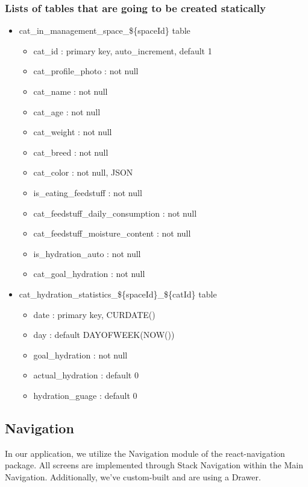 \documentclass[conference]{IEEEtran}
\begin{document}
\subsubsection{Lists of tables that are going to be created statically}
\begin{itemize}
    \item cat\_in\_management\_space\_\$\{spaceId\} table
    \begin{itemize}
        \item cat\_id : primary key, auto\_increment, default 1
        \item cat\_profile\_photo : not null
        \item cat\_name : not null
        \item cat\_age : not null
        \item cat\_weight : not null
        \item cat\_breed : not null
        \item cat\_color : not null, JSON
        \item is\_eating\_feedstuff : not null
        \item cat\_feedstuff\_daily\_consumption : not null
        \item cat\_feedstuff\_moisture\_content : not null
        \item is\_hydration\_auto : not null
        \item cat\_goal\_hydration : not null
    \end{itemize}
    \item cat\_hydration\_statistics\_\$\{spaceId\}\_\$\{catId\} table
    \begin{itemize}
        \item date : primary key, CURDATE()
        \item day : default DAYOFWEEK(NOW())
        \item goal\_hydration : not null
        \item actual\_hydration : default 0
        \item hydration\_guage : default 0\\
    \end{itemize}
\end{itemize}

\subsection{Navigation}
In our application, we utilize the Navigation module of the react-navigation package. All screens are implemented through Stack Navigation within the Main Navigation. Additionally, we've custom-built and are using a Drawer. \\
\end{document}
